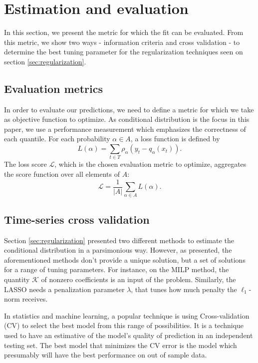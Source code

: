 \section{Estimation and evaluation}

In this section, we present the metric for which the fit can be evaluated. From this metric, we show two ways - information criteria and cross validation - to determine the best tuning parameter for the regularization techniques seen on section \ref{sec:regularization}.

\subsection{Evaluation metrics}
In order to evaluate our predictions, we need to define a metric for which we take as objective function to optimize. 
As conditional distribution is the focus in this paper, we use a performance measurement which emphasizes the correctness of each quantile. 
For each probability $\alpha \in A$, a loss function
is defined by
\begin{equation}
	L(\alpha)= \sum_{t\in T}\rho_{\alpha}(y_{t}-q_{\alpha}(x_t)).
\end{equation}
The loss score $\mathcal{L}$, which is the chosen evaluation metric to optimize, aggregates the score function over all elements of $A$:
\begin{equation}
\mathcal{L}= \frac{1}{|A|}\sum_{\alpha \in A}L(\alpha).
\end{equation}




\subsection{Time-series cross validation}

Section \ref{sec:regularization} presented two different methods to estimate the conditional distribution in a parsimonious way. However, as presented, the aforementioned methods don't provide a unique solution, but a set of solutions for a range of tuning parameters. For instance, on the MILP method, the quantity $\mathcal{K}$ of nonzero coefficients is an input of the problem. Similarly, the LASSO needs a penalization parameter $\lambda$, that tunes how much penalty the $\ell_1$-norm receives.

In statistics and machine learning, a popular technique is using Cross-validation (CV) to select the best model from this range of possibilities.
It is a technique used to have an estimative of the model's quality of prediction in an independent testing set. The best model that minimizes the CV error is the model which presumably will have the best performance on out of sample data.

